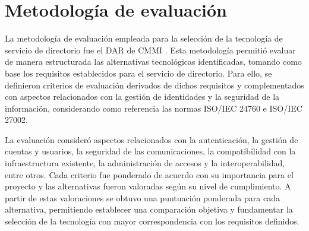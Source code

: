 \section{Metodología de evaluación}\label{sec:dar-metodologia}

La metodología de evaluación empleada para la selección de la tecnología de servicio de directorio fue el \ac{DAR} de \ac{CMMI} \citep{CMMIInstitute2010}. Esta metodología permitió evaluar de manera estructurada las alternativas tecnológicas identificadas, tomando como base los requisitos establecidos para el servicio de directorio. Para ello, se definieron criterios de evaluación derivados de dichos requisitos y complementados con aspectos relacionados con la gestión de identidades y la seguridad de la información, considerando como referencia las normas ISO/IEC 24760 e ISO/IEC 27002.

La evaluación consideró aspectos relacionados con la autenticación, la gestión de cuentas y usuarios, la seguridad de las comunicaciones, la compatibilidad con la infraestructura existente, la administración de accesos y la interoperabilidad, entre otros. Cada criterio fue ponderado de acuerdo con su importancia para el proyecto y las alternativas fueron valoradas según su nivel de cumplimiento. A partir de estas valoraciones se obtuvo una puntuación ponderada para cada alternativa, permitiendo establecer una comparación objetiva y fundamentar la selección de la tecnología con mayor correspondencia con los requisitos definidos.
